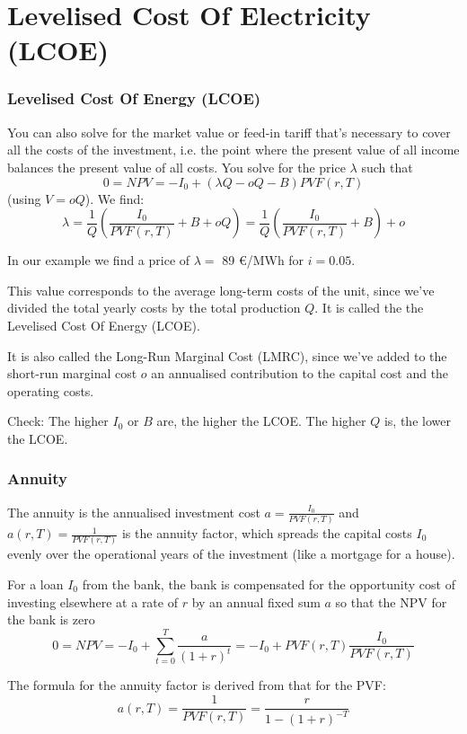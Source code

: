 \documentclass[10pt,aspectratio=169,dvipsnames]{beamer}
\begin{document}
\section{Levelised Cost Of Electricity (LCOE)}




\begin{frame}
  \frametitle{Levelised Cost Of Energy (LCOE)}

  You can also solve for the market value or feed-in tariff that's
  necessary to cover all the costs of the investment, i.e. the point
  where the present value of all income balances the present value of
  all costs.  You solve for the price $\lambda$ such that
  \begin{equation*}
   0 = NPV = -I_0 + (\lambda Q - oQ - B) PVF(r,T)
  \end{equation*}
  (using $V = oQ$). We find:
  \begin{equation*}
    \lambda = \frac{1}{Q} \left( \frac{I_0}{PVF(r,T)} + B + oQ \right) = \frac{1}{Q} \left( \frac{I_0}{PVF(r,T)} + B  \right) + o
  \end{equation*}

  In our example we find a price of $\lambda =$ 89 \euro/MWh for $i=0.05$. %

  This value corresponds to the average long-term costs of the unit, since we've divided the total yearly costs by the total production $Q$. It is called the
the \alert{Levelised Cost Of Energy (LCOE)}.

  It is also called the  \alert{Long-Run Marginal Cost (LMRC)}, since we've added to the short-run marginal cost $o$ an annualised contribution to the capital cost and the operating costs.

  Check: The higher $I_0$ or $B$ are, the higher the LCOE. The higher $Q$ is, the lower the LCOE.
\end{frame}



\begin{frame}
  \frametitle{Annuity}

  The \alert{annuity} is the annualised investment cost $a = \frac{I_0}{PVF(r,T)}$ and
  $a(r,T) = \frac{1}{PVF(r,T)}$ is the \alert{annuity factor}, which spreads the capital costs $I_0$ evenly over the operational years of the investment (like a mortgage for a house).

  For a loan $I_0$ from the bank, the bank is compensated for the \alert{opportunity cost} of investing elsewhere at a rate of $r$ by an annual fixed sum $a$ so that the NPV for the bank is zero
  \begin{equation*}
    0 = NPV  = -I_0 + \sum_{t=0}^T \frac{a}{(1+r)^t} = -I_0 + PVF(r,T) \frac{I_0}{PVF(r,T)}
  \end{equation*}

  The formula for the annuity factor is derived from that for the PVF:
  \begin{equation*}
     a(r,T)  = \frac{1}{PVF(r,T)} = \frac{ r}{ 1 - (1+r)^{-T}}
  \end{equation*}


\end{frame}
\end{document}
